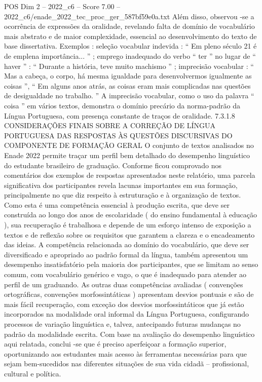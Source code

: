 \begin{textsample}{POS Dim 2 – 2022\_c6 – Score 7.00 – 2022\_c6/enade\_2022\_tec\_proc\_ger\_587bf59e0a.txt}
Além disso, observou -se a ocorrência de expressões da oralidade, revelando falta de domínio de vocabulário mais abstrato e de maior complexidade, essencial ao desenvolvimento do texto de base dissertativa.
Exemplos : seleção vocabular indevida : “ Em pleno século 21 é de emplena importância... ” ; emprego inadequado do verbo “ ter ” no lugar de “ haver ” : “ Durante a história, teve muito machismo ” ; imprecisão vocabular : “ Mas a cabeça, o corpo, há mesma igualdade para desenvolvermos igualmente as coisas ”, “ Em alguns anos atrás, as coisas eram mais complicadas nas questões de desigualdade no trabalho. ” A imprecisão vocabular, como o uso da palavra “ coisa ” em vários textos, demonstra o domínio precário da norma-padrão da Língua Portuguesa, com presença constante de traços de oralidade. 7.3.1.8 CONSIDERAÇÕES FINAIS SOBRE A CORREÇÃO DE LÍNGUA PORTUGUESA DAS RESPOSTAS ÀS QUESTÕES DISCURSIVAS DO COMPONENTE DE FORMAÇÃO GERAL O conjunto de textos analisados no Enade 2022 permite traçar um perfil bem detalhado do desempenho linguístico do estudante brasileiro de graduação.
Conforme ficou comprovado nos comentários dos exemplos de respostas apresentados neste relatório, uma parcela significativa dos participantes revela lacunas importantes em sua formação, principalmente no que diz respeito à estruturação e à organização de textos.
Como esta é uma competência essencial à produção escrita, que deve ser construída ao longo dos anos de escolaridade ( do ensino fundamental à educação ), sua recuperação é trabalhosa e depende de um esforço intenso de exposição a textos e de reflexão sobre os requisitos que garantem a clareza e o encadeamento das ideias.
A competência relacionada ao domínio do vocabulário, que deve ser diversificado e apropriado ao padrão formal da língua, também apresentou um desempenho insatisfatório pela maioria dos participantes, que se limitam ao senso comum, com vocabulário genérico e vago, o que é inadequado para atender ao perfil de um graduando.
As outras duas competências avaliadas ( convenções ortográficas, convenções morfossintáticas ) apresentam desvios pontuais e são de mais fácil recuperação, com exceção dos desvios morfossintáticos que já estão incorporados na modalidade oral informal da Língua Portuguesa, configurando processos de variação linguística e, talvez, antecipando futuras mudanças no padrão da modalidade escrita.
Com base na avaliação do desempenho linguístico aqui relatada, conclui -se que é preciso aperfeiçoar a formação superior, oportunizando aos estudantes mais acesso às ferramentas necessárias para que sejam bem-sucedidos nas diferentes situações de sua vida cidadã – profissional, cultural e política.

\end{textsample}
